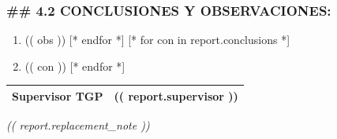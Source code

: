 \documentclass[letterpaper,11pt]{article}
\newcommand{\supervisor}{(( report.supervisor ))}
\newcommand{\notareemplazo}{(( report.replacement_note ))}
\begin{document}
\vspace{0.5cm}

\vspace{0.5cm}

\subsubsection*{## 4.2 CONCLUSIONES Y OBSERVACIONES:}

\begin{enumerate}[label=\arabic*.-, leftmargin=*]
  [* for obs in report.observations *]
  \item (( obs ))
  [* endfor *]
  [* for con in report.conclusions *]
  \item (( con ))
  [* endfor *]
\end{enumerate}

\vspace{0.8cm}

\noindent
\begin{tabular}{|l|l|}
  \hline
  \textbf{Supervisor TGP} & \supervisor \\
  \hline
\end{tabular}

\vspace{0.8cm}

{\itshape\small
\notareemplazo
}
\end{document}

